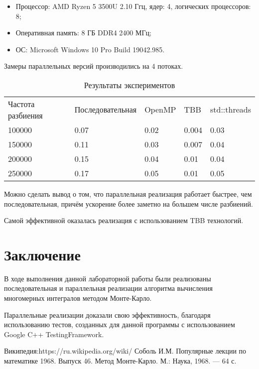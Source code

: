 \documentclass{report}
\begin{document}
\begin{itemize}
\item Процессор: AMD Ryzen 5 3500U 2.10 Ггц, ядер: 4, логических процессоров: 8;
\item Оперативная память: 8 ГБ DDR4 2400 МГц;
\item ОС: Microsoft Windows 10 Pro Build 19042.985.
\end{itemize}
\par Замеры параллельных версий производились на 4 потоках.
\begin{table}[!h]
\caption{Результаты экспериментов}
\centering
\begin{tabular}{lllll}
Частота разбиения & Последовательная & OpenMP & TBB & std::threads     \\
100000    & 0.07                    & 0.02       & 0.004    & 0.03     \\
150000    & 0.11                    & 0.03       & 0.007    & 0.04     \\
200000   & 0.15                    & 0.04       & 0.01      & 0.04     \\
250000   & 0.17                   & 0.05       & 0.01       & 0.05     \\
\end{tabular}
\end{table}

\par Можно сделать вывод о том, что параллельная реализация работает быстрее, чем последовательная, причём ускорение более заметно на большем числе разбиений.
\par Самой эффективной оказалась реализация с использованием TBB технологий.
\newpage

\section*{Заключение}
В ходе выполнения данной лабораторной работы были реализованы последовательная и параллельная реализации алгоритма вычисления многомерных интегралов методом Монте-Карло.
\par Параллельные реализации доказали свою эффективность, благодаря использованию тестов, созданных для данной программы с использованием Google C++ TestingFramework.
\newpage

\begin{thebibliography}{1}
 Википедия:https://ru.wikipedia.org/wiki/%
 Соболь И.М. Популярные лекции по математике 1968. Выпуск 46.
Метод Монте-Карло. М.: Наука, 1968. — 64 с.
\end{thebibliography}
\newpage
\end{document}

